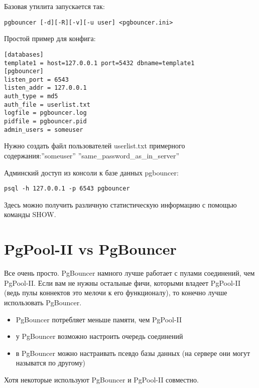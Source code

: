 Базовая утилита запускается так:
\begin{lstlisting}[label=lst:pgbouncer1,caption=PgBouncer]
pgbouncer [-d][-R][-v][-u user] <pgbouncer.ini>
\end{lstlisting}

Простой пример для конфига:
\begin{lstlisting}[label=lst:pgbouncer2,caption=PgBouncer]
[databases]
template1 = host=127.0.0.1 port=5432 dbname=template1
[pgbouncer]
listen_port = 6543
listen_addr = 127.0.0.1
auth_type = md5
auth_file = userlist.txt
logfile = pgbouncer.log
pidfile = pgbouncer.pid
admin_users = someuser
\end{lstlisting}

Нужно создать файл пользователей userlist.txt примерного содержания:''someuser'' ''same\_password\_as\_in\_server''

Админский доступ из консоли к базе данных pgbouncer:
\begin{lstlisting}[label=lst:pgbouncer3,caption=PgBouncer]
psql -h 127.0.0.1 -p 6543 pgbouncer
\end{lstlisting}

Здесь можно получить различную статистическую информацию с помощью команды SHOW.

\section{PgPool-II vs PgBouncer}

Все очень просто. PgBouncer намного лучше работает с пулами соединений, чем PgPool-II. Если вам не 
нужны остальные фичи, которыми владеет PgPool-II (ведь пулы коннектов это мелочи к его функционалу), 
то конечно лучше использовать PgBouncer. 
\begin{itemize}
\item PgBouncer потребляет меньше памяти, чем PgPool-II
\item у PgBouncer возможно настроить очередь соединений
\item в PgBouncer можно настраивать псевдо базы данных (на сервере они могут называтся по другому)
\end{itemize}

Хотя некоторые используют PgBouncer и PgPool-II совместно.